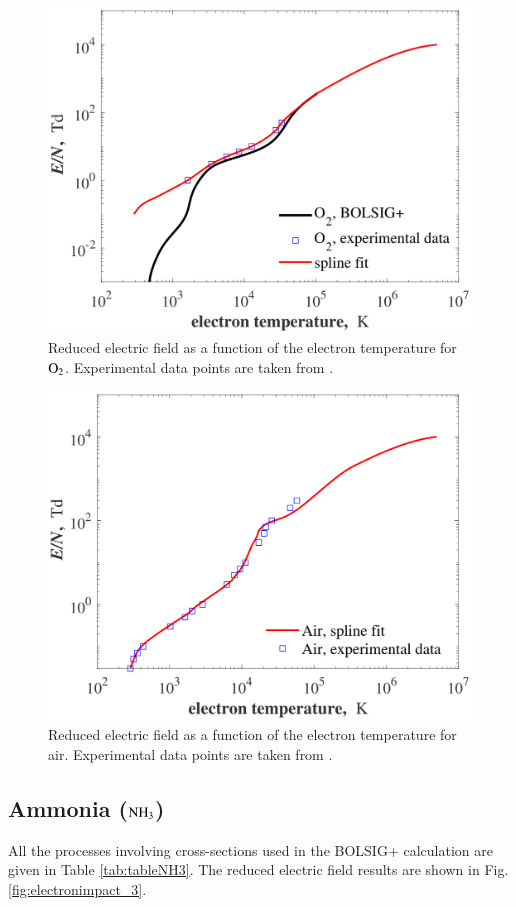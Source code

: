 \begin{figure}[!ht]
\centering     %
\includegraphics[width=0.7\linewidth, angle=0.0]{electronimpact_figs/electronimpact_fig2.png}
\caption{Reduced electric field as a function of the electron temperature for $\rm O_2$. Experimental data points are taken from .}
\label{fig:electronimpact_2}
\end{figure}

\begin{figure}[!ht]
\centering     %
\includegraphics[width=0.7\linewidth, angle=0.0]{electronimpact_figs/electronimpact_fig5.png}
\caption{Reduced electric field as a function of the electron temperature for air. Experimental data points are taken from .}
\label{fig:electronimpact_5}
\end{figure}

\subsection{Ammonia ($\rm NH_3$)}

All the processes involving cross-sections used in the BOLSIG+ calculation are given in Table \ref{tab:tableNH3}. The reduced electric field results are shown in Fig. \ref{fig:electronimpact_3}.


